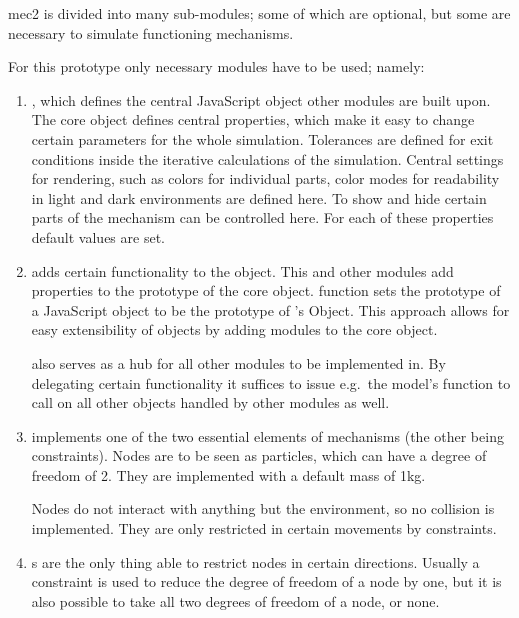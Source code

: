 mec2 is divided into many sub-modules; some of which are optional, but some are necessary to simulate functioning mechanisms.

For this prototype only necessary modules have to be used; namely:
\begin{enumerate}
    \item {}, which defines the central JavaScript object other modules are built upon.
    The core  object defines central properties, which make it easy to change certain parameters for the whole simulation.
    Tolerances are defined for exit conditions inside the iterative calculations of the simulation.
    Central settings for rendering, such as colors for individual parts, color modes for readability in light and dark environments are defined here.
    To show and hide certain parts of the mechanism can be controlled here.
    For each of these properties default values are set.

    \item {} adds certain functionality to the  object. 
    This and other  modules add properties to the prototype of the  core object.
      function sets the prototype of a JavaScript object to be the prototype of 's  Object.
    This approach allows for easy extensibility of objects by adding modules to the core object.

     also serves as a hub for all other modules to be implemented in.
    By delegating certain functionality it suffices to issue e.g.\ the model's  function to call  on all other objects handled by other modules as well.
    
    \item {} implements one of the two essential elements of mechanisms (the other being constraints). Nodes are to be seen as particles, which can have a degree of freedom of 2. They are implemented with a default mass of 1kg.
    
    Nodes do not interact with anything but the environment, so no collision is implemented.
    They are only restricted in certain movements by constraints.

    \item {}s are the only thing able to restrict nodes in certain directions.
    Usually a constraint is used to reduce the degree of freedom of a node by one, but it is also possible to take all two degrees of freedom of a node, or none.
\end{enumerate}

